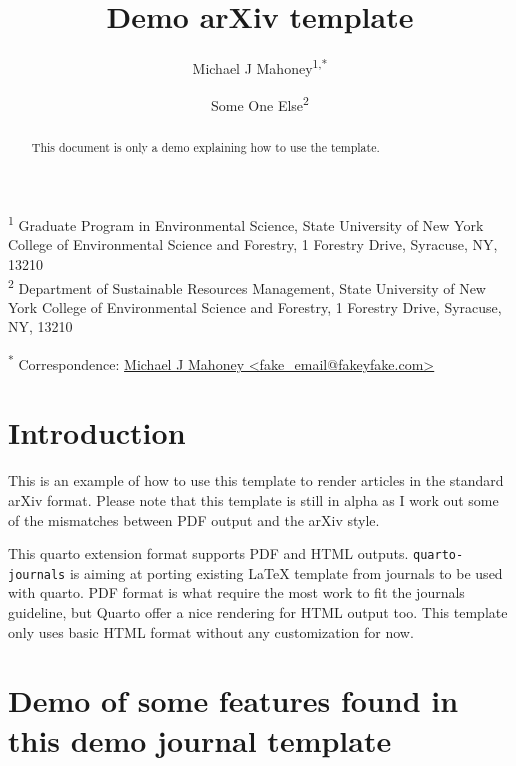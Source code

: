 \documentclass[
]{article}
\title{Demo arXiv template}
\author{Michael J Mahoney\textsuperscript{1,*} \and Some One Else\textsuperscript{2}}
\date{}
\begin{document}
\maketitle
\begin{abstract}
This document is only a demo explaining how to use the template.
\end{abstract}
\ifdefined\Shaded\renewenvironment{Shaded}{\begin{tcolorbox}[boxrule=0pt, borderline west={3pt}{0pt}{shadecolor}, interior hidden, frame hidden, sharp corners, breakable, enhanced]}{\end{tcolorbox}}\fi

\textsuperscript{1} Graduate Program in Environmental Science, State
University of New York College of Environmental Science and Forestry, 1
Forestry Drive, Syracuse, NY, 13210\\
\textsuperscript{2} Department of Sustainable Resources Management,
State University of New York College of Environmental Science and
Forestry, 1 Forestry Drive, Syracuse, NY, 13210

\textsuperscript{*} Correspondence:
\href{mailto:fake_email@fakeyfake.com}{Michael J Mahoney
\textless{}fake\_email@fakeyfake.com\textgreater{}}

\hypertarget{sec-intro}{%
\section{Introduction}\label{sec-intro}}

This is an example of how to use this template to render articles in the
standard arXiv format. Please note that this template is still in alpha
as I work out some of the mismatches between PDF output and the arXiv
style.

This quarto extension format supports PDF and HTML outputs.
\texttt{quarto-journals} is aiming at porting existing {\LaTeX} template
from journals to be used with quarto. PDF format is what require the
most work to fit the journals guideline, but Quarto offer a nice
rendering for HTML output too. This template only uses basic HTML format
without any customization for now.

\hypertarget{demo-of-some-features-found-in-this-demo-journal-template}{%
\section{Demo of some features found in this demo journal
template}\label{demo-of-some-features-found-in-this-demo-journal-template}}
\end{document}
